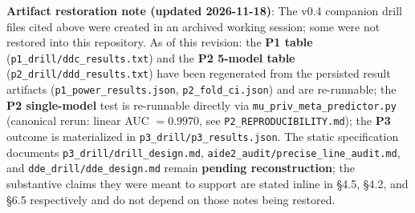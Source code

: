 \textbf{Artifact restoration note (updated 2026-11-18)}: The v0.4 companion drill files cited above were created in an archived working session; some were not restored into this repository. As of this revision: the \textbf{P1 table} (\texttt{p1\_drill/ddc\_results.txt}) and the \textbf{P2 5-model table} (\texttt{p2\_drill/ddd\_results.txt}) have been regenerated from the persisted result artifacts (\texttt{p1\_power\_results.json}, \texttt{p2\_fold\_ci.json}) and are re-runnable; the \textbf{P2 single-model} test is re-runnable directly via \texttt{mu\_priv\_meta\_predictor.py} (canonical rerun: linear AUC $=0.9970$, see \texttt{P2\_REPRODUCIBILITY.md}); the \textbf{P3} outcome is materialized in \texttt{p3\_drill/p3\_results.json}. The static specification documents \texttt{p3\_drill/drill\_design.md}, \texttt{aide2\_audit/precise\_line\_audit.md}, and \texttt{dde\_drill/dde\_design.md} remain \textbf{pending reconstruction}; the substantive claims they were meant to support are stated inline in \S4.5, \S4.2, and \S6.5 respectively and do not depend on those notes being restored.